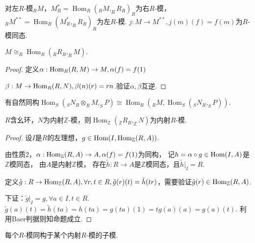     \begin{example}
        对左$R$-模$_RM$，$M_R^*=\operatorname{Hom}_R(_RM,_RR_R)_R$为右$R$-模，
        $_RM^{**}=\operatorname{Hom}_R(M_R^*,_RR_R)_R$为左$R$-模. 
        $j:M\rightarrow M^{**},j(m)(f)=f(m)$为$R$-模同态.
    \end{example}
    \begin{proposition}
        $M\cong _R\operatorname{Hom}_R(_RR_R,_RM)$.
    \end{proposition}
\begin{proof}
定义$\alpha:\operatorname{Hom}_R(R,M)\rightarrow M,\alpha(f)=f(1)$

$\beta:M\rightarrow \operatorname{Hom}_R(R,N),\beta(n)(r)=rn$.验证$\alpha,\beta$互逆.
\end{proof}
    \begin{proposition}
        有自然同构$\operatorname{Hom}_S(_SN_R{\otimes }_RM,_SP)\cong \operatorname{Hom}_R(_RM,\operatorname{Hom}_S(_SN_R,_SP)).$
    \end{proposition}
    \begin{proposition}
        $R$含幺环，$N$为内射$\mathbb{Z}$-模，则$\operatorname{Hom}_{\mathbb{Z}}(_{\mathbb{Z}}R_R,_{\mathbb{Z}}N)$为内射$R$-模.

    \end{proposition}
\begin{proof}
设$ I $是$ R $的左理想，$g\in \operatorname{Hom}(I,\operatorname{Hom}_{\mathbb Z}(R,A))$.

由性质2，$\alpha : \operatorname{Hom}_{\mathbb Z}(R,A)\rightarrow A,\alpha(f)=f(1)$为同构，
记$h=\alpha\circ g \in \operatorname{Hom}(I,A)$是$\mathbb Z$模同态，
由$A$是内射$\mathbb Z$模，
存在$\tilde{h}:R\rightarrow A$是$\mathbb Z$模同态，且$\tilde{h}|_I=R$.

定义$\tilde g:R\rightarrow \operatorname{Hom}_{\mathbb{Z}}(R,A),\forall r,t\in R,
\tilde{g}(r)(t)=\tilde{h}(tr)$，需要验证$\tilde{g}(r)\in \operatorname{Hom}_{\mathbb Z}(R,A)$.

下证：$\tilde{g}|_I=g,\forall a \in I,t\in R$.
$\tilde{g}(a)(t)=\tilde h(ta)=h(ta)=g(ta)(1)=tg(a)(a)=g(a)(t)$.
利用Baer判据则知命题成立.
\end{proof}
    \begin{proposition}
        每个$R$-模同构于某个内射$R$-模的子模.
    \end{proposition}
